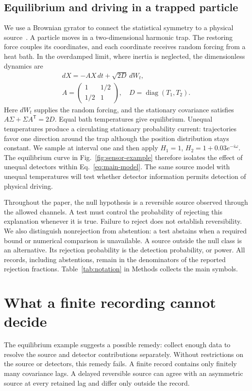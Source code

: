 \subsection{Equilibrium and driving in a trapped particle}
We use a Brownian gyrator to connect the statistical symmetry to a physical source~\cite{filliger2007,cerasolispectra2022,argun2017}. A particle moves in a two-dimensional harmonic trap. The restoring force couples its coordinates, and each coordinate receives random forcing from a heat bath. In the overdamped limit, where inertia is neglected, the dimensionless dynamics are
\begin{equation}
 \begin{gathered}
 dX=-AX\,dt+\sqrt{2D}\,dW_t,\\
 A=\begin{pmatrix}1&1/2\\1/2&1\end{pmatrix},\quad
 D=\operatorname{diag}(T_1,T_2).
 \end{gathered}
 \label{eq:ou-model}
\end{equation}
Here $dW_t$ supplies the random forcing, and the stationary covariance satisfies $A\Sigma+\Sigma A^{\mathsf T}=2D$. Equal bath temperatures give equilibrium. Unequal temperatures produce a circulating stationary probability current: trajectories favor one direction around the trap although the position distribution stays constant. We sample at interval one and then apply $H_1=1$, $H_2=1+0.03e^{-i\omega}$. The equilibrium curve in Fig.~\ref{fig:sensor-example} therefore isolates the effect of unequal detectors within Eq.~\eqref{eq:main-model}. The same source model with unequal temperatures will test whether detector information permits detection of physical driving.

Throughout the paper, the null hypothesis is a reversible source observed through the allowed channels. A test must control the probability of rejecting this explanation whenever it is true. Failure to reject does not establish reversibility. We also distinguish nonrejection from abstention: a test abstains when a required bound or numerical comparison is unavailable. A source outside the null class is an alternative. Its rejection probability is the detection probability, or power. All records, including abstentions, remain in the denominators of the reported rejection fractions. Table~\ref{tab:notation} in Methods collects the main symbols.

\section{What a finite recording cannot decide}\label{sec:ambiguity}
The equilibrium example suggests a possible remedy: collect enough data to resolve the source and detector contributions separately. Without restrictions on the source or detectors, this remedy fails. A finite record contains only finitely many covariance lags. A delayed reversible source can agree with an asymmetric source at every retained lag and differ only outside the record.

